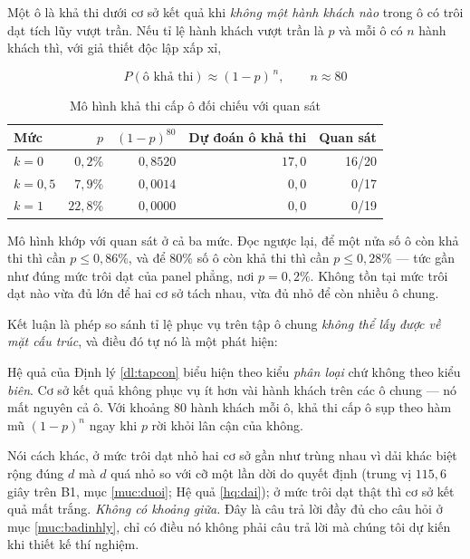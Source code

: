 Một ô là khả thi dưới cơ sở kết quả khi \emph{không một hành khách nào} trong ô có trôi dạt tích
lũy vượt trần. Nếu tỉ lệ hành khách vượt trần là $p$ và mỗi ô có $n$ hành khách thì, với giả
thiết độc lập xấp xỉ,

\begin{equation}
P(\text{ô khả thi}) \approx (1-p)^{\,n}, \qquad n \approx 80
\end{equation}

\begin{table}[htbp]
\centering
\caption{Mô hình khả thi cấp ô đối chiếu với quan sát}
\label{bang:mohinh-kha-thi}
\small
\begin{tabular}{@{}lrrrr@{}}
\toprule
\textbf{Mức} & $p$ & $(1-p)^{80}$ & \textbf{Dự đoán ô khả thi} & \textbf{Quan sát}\\
\midrule
$k=0$ & $0{,}2\%$ & $0{,}8520$ & $17{,}0$ & 16/20\\
$k=0{,}5$ & $7{,}9\%$ & $0{,}0014$ & $0{,}0$ & 0/17\\
$k=1$ & $22{,}8\%$ & $0{,}0000$ & $0{,}0$ & 0/19\\
\bottomrule
\end{tabular}
\end{table}

Mô hình khớp với quan sát ở cả ba mức. Đọc ngược lại, để một nửa số ô còn khả thi thì cần
$p \le 0{,}86\%$, và để $80\%$ số ô còn khả thi thì cần $p \le 0{,}28\%$ --- tức gần như đúng
mức trôi dạt của panel phẳng, nơi $p = 0{,}2\%$. Không tồn tại mức trôi dạt nào vừa đủ lớn để
hai cơ sở tách nhau, vừa đủ nhỏ để còn nhiều ô chung.

Kết luận là phép so sánh tỉ lệ phục vụ trên tập ô chung \emph{không thể lấy được về mặt cấu
trúc}, và điều đó tự nó là một phát hiện:

\begin{khungy}
Hệ quả của Định lý \ref{dl:tapcon} biểu hiện theo kiểu \emph{phân loại} chứ không theo kiểu
\emph{biên}.
Cơ sở kết quả không phục vụ ít hơn vài hành khách trên các ô chung --- nó mất nguyên cả ô. Với
khoảng 80 hành khách mỗi ô, khả thi cấp ô sụp theo hàm mũ $(1-p)^{n}$ ngay khi $p$ rời khỏi
lân cận của không.
\end{khungy}

Nói cách khác, ở mức trôi dạt nhỏ hai cơ sở gần như trùng nhau vì dải khác biệt rộng đúng $d$
mà $d$ quá nhỏ so với cỡ một lần dời do quyết định (trung vị $115{,}6$ giây trên B1, mục
\ref{muc:duoi}; Hệ quả \ref{hq:dai}); ở mức trôi dạt thật thì cơ sở
kết quả mất trắng. \emph{Không có khoảng giữa.} Đây là câu trả lời đầy đủ cho câu hỏi ở mục
\ref{muc:badinhly}, chỉ có điều nó không phải câu trả lời mà chúng tôi dự kiến khi thiết kế thí
nghiệm.

